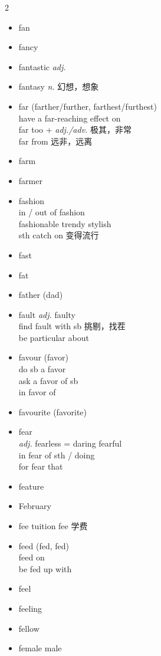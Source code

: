 \documentclass[../../book.tex]{subfiles}
\begin{document}
\begin{multicols}{2}
\begin{itemize}
\begin{tabular}{@{} r | @{\hspace{0.1em}} l @{}}
 & famous as/for
\\& noted/celebrated/well-known
\end{tabular}
\item[-] fan
\item[-] fancy
\item[-] fantastic \emph{adj.}
\item[-] fantasy \emph{n.} 幻想，想象
\item[-] far (farther/further, farthest/furthest)
\\have a far-reaching effect on
\\far too + \emph{adj./adv.} 极其，非常
\\far from 远非，远离
\item[-] farm
\item[-] farmer
\item[-] fashion
\\in / out of fashion
\\fashionable trendy stylish
\\sth catch on 变得流行
\item[-] fast
\item[-] fat
\item[-] father (dad)
\item[-] fault \phantom{a} \emph{adj.} faulty
\\find fault with sb 挑剔，找茬
\\be particular about
\item[-] favour (favor)
\\do sb a favor
\\ask a favor of sb
\\in favor of
\item[-] favourite (favorite)
\item[-] fear
\\\emph{adj.} fearless = daring \phantom{a} fearful
\\in fear of sth / doing
\\for fear that
\item[-] feature
\item[-] February
\item[-] fee \phantom{a} tuition fee 学费
\item[-] feed (fed, fed)
\\feed on
\\be fed up with
\item[-] feel
\item[-] feeling
\item[-] fellow
\item[-] female \phantom{a} male

\end{itemize}
\end{multicols}
\end{document}
